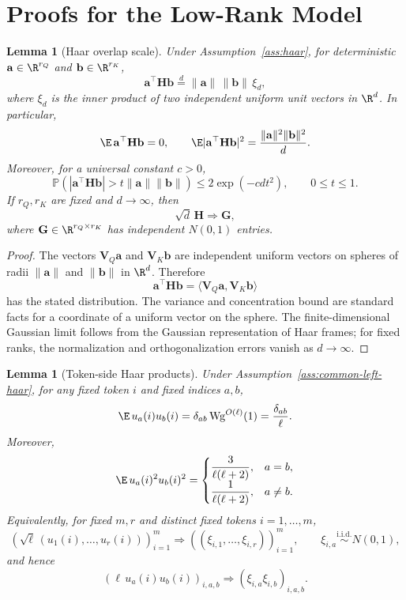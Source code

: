 \documentclass{article}
\newcommand{\Prob}{\mathbb{P}}
\newcommand{\weak}{\Rightarrow}
\newcommand{\bV}{\mathbf{V}}
\newcommand{\bG}{\mathbf{G}}
\newcommand{\bH}{\mathbf{H}}
\newtheorem{lemma}[theorem]{Lemma}
\theoremstyle{remark}
\begin{document}
\section{Proofs for the Low-Rank Model}

\begin{lemma}[Haar overlap scale]
Under Assumption~\ref{ass:haar}, for deterministic
$\mathbf a\in\R^{r_Q}$ and $\mathbf b\in\R^{r_K}$,
\[
    \mathbf a^\top\bH\mathbf b
    \stackrel{d}{=}
    \|\mathbf a\|\,\|\mathbf b\|\,\xi_d,
\]
where $\xi_d$ is the inner product of two independent uniform unit vectors in
$\R^d$.  In particular,
\[
    \E\,\mathbf a^\top\bH\mathbf b=0,
    \qquad
    \E|\mathbf a^\top\bH\mathbf b|^2
    =
    \frac{\|\mathbf a\|^2\|\mathbf b\|^2}{d}.
\]
Moreover, for a universal constant $c>0$,
\[
    \Prob\left(
    |\mathbf a^\top\bH\mathbf b|
    >
    t\|\mathbf a\|\|\mathbf b\|
    \right)
    \leq 2\exp(-cdt^2),
    \qquad 0\leq t\leq 1.
\]
If $r_Q,r_K$ are fixed and $d\to\infty$, then
\[
        \sqrt d\,\bH\weak \bG,
\]
where $\bG\in\R^{r_Q\times r_K}$ has independent $N(0,1)$ entries.
\label{lem:haar-overlap}
\end{lemma}

\begin{proof}
The vectors $\bV_Q\mathbf a$ and $\bV_K\mathbf b$ are independent uniform
vectors on spheres of radii $\|\mathbf a\|$ and $\|\mathbf b\|$ in $\R^d$.
Therefore
\[
    \mathbf a^\top\bH\mathbf b
    =
    \langle \bV_Q\mathbf a,\bV_K\mathbf b\rangle
\]
has the stated distribution.  The variance and concentration bound are standard
facts for a coordinate of a uniform vector on the sphere.  The finite-dimensional
Gaussian limit follows from the Gaussian representation of Haar frames; for
fixed ranks, the normalization and orthogonalization errors vanish as
$d\to\infty$.
\end{proof}

\begin{lemma}[Token-side Haar products]
Under Assumption~\ref{ass:common-left-haar}, for any fixed token $i$ and fixed
indices $a,b$,
\[
    \E\,u_a(i)u_b(i)=\delta_{ab}\,\mathrm{Wg}^{O(\ell)}(1)
    =
    \frac{\delta_{ab}}{\ell}.
\]
Moreover,
\[
    \E\,u_a(i)^2u_b(i)^2
    =
    \begin{cases}
    \displaystyle \frac{3}{\ell(\ell+2)}, & a=b,\\[1ex]
    \displaystyle \frac{1}{\ell(\ell+2)}, & a\neq b.
    \end{cases}
\]
Equivalently, for fixed $m,r$ and distinct fixed tokens $i=1,\ldots,m$,
\[
    \left(\sqrt{\ell}\,(u_1(i),\ldots,u_r(i))\right)_{i=1}^m
    \weak
    \left((\xi_{i,1},\ldots,\xi_{i,r})\right)_{i=1}^m,
    \qquad
    \xi_{i,a}\stackrel{\mathrm{i.i.d.}}{\sim}N(0,1),
\]
and hence
\[
    \left(\ell\,u_a(i)u_b(i)\right)_{i,a,b}
    \weak
    \left(\xi_{i,a}\xi_{i,b}\right)_{i,a,b}.
\]
\label{lem:token-haar-products}
\end{lemma}
\end{document}
